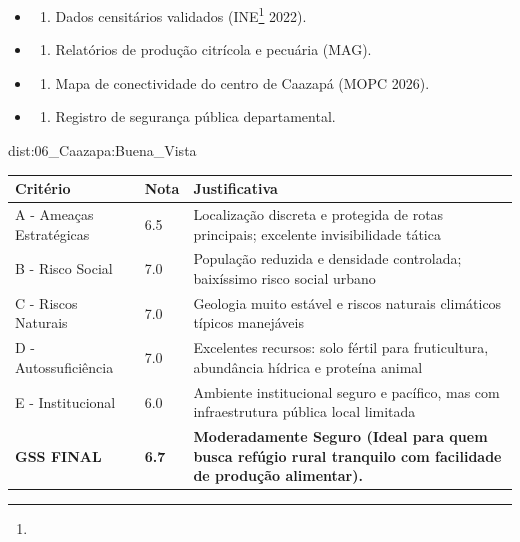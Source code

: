 {\begin{itemize}
\tightlist
\item
  \begin{enumerate}
  \def\labelenumi{\arabic{enumi})}
  \tightlist
  \item
    Dados censitários validados (INE\footnote{\fineINE} 2022).
  \end{enumerate}
\item
  \begin{enumerate}
  \def\labelenumi{\arabic{enumi})}
  \setcounter{enumi}{1}
  \tightlist
  \item
    Relatórios de produção citrícola e pecuária (MAG).
  \end{enumerate}
\item
  \begin{enumerate}
  \def\labelenumi{\arabic{enumi})}
  \setcounter{enumi}{2}
  \tightlist
  \item
    Mapa de conectividade do centro de Caazapá (MOPC 2026).
  \end{enumerate}
\item
  \begin{enumerate}
  \def\labelenumi{\arabic{enumi})}
  \setcounter{enumi}{3}
  \tightlist
  \item
    Registro de segurança pública departamental.
  \end{enumerate}
\end{itemize}}{dist:06_Caazapa:Buena_Vista}
\begin{table}[ht!]
\small \begin{tabular}{p{3.0cm}p{0.8cm}p{6.0cm}} \toprule
\textbf{Critério} & \textbf{Nota} & \textbf{Justificativa} \\ \midrule
A - Ameaças Estratégicas & 6.5 & Localização discreta e protegida de rotas principais; excelente invisibilidade tática \\
B - Risco Social & 7.0 & População reduzida e densidade controlada; baixíssimo risco social urbano \\
C - Riscos Naturais & 7.0 & Geologia muito estável e riscos naturais climáticos típicos manejáveis \\
D - Autossuficiência & 7.0 & Excelentes recursos: solo fértil para fruticultura, abundância hídrica e proteína animal \\
E - Institucional & 6.0 & Ambiente institucional seguro e pacífico, mas com infraestrutura pública local limitada \\
\midrule \textbf{GSS FINAL} & \textbf{6.7} & \textbf{Moderadamente Seguro (Ideal para quem busca refúgio rural tranquilo com facilidade de produção alimentar).} \\ \bottomrule \end{tabular}
\end{table}

